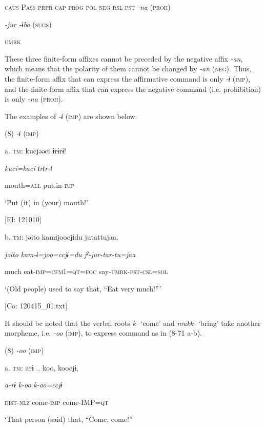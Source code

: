     \textsc{caus}  P\textsc{ass}  \textsc{prpr}  \textsc{cap}  \textsc{prog}  \textsc{pol}  \textsc{neg}  \textsc{rsl}  \textsc{pst}    \textit{{}-na} (\textsc{proh})

          \textit{{}-jur      {}-ɨba} (\textsc{sugs})

          \textsc{umrk}

These three finite-form affixes cannot be preceded by the negative affix \textit{{}-an}, which means that the polarity of them cannot be changed by \textit{{}-an} (\textsc{neg}). Thus, the finite-form affix that can express the affirmative command is only \textit{{}-ɨ} (\textsc{imp}), and the finite-form affix that can express the negative command (i.e. prohibition) is only \textit{{}-na} (\textsc{proh}).

  The examples of \textit{{}-ɨ} (\textsc{imp}) are shown below.

(8)  \textit{{}-ɨ} (\textsc{imp})

  a.  \textsc{tm}:  kucjəəci  ɨrɨrɨ!

      \textit{kuci=kaci}  \textit{ɨrɨr-ɨ}

      mouth=\textsc{all}  put.in-\textsc{imp}

      ‘Put (it) in (your) mouth!’

      [El: 121010]

  b.  \textsc{tm}:  jəito  kamɨjoocjɨdu  jutattujaa.

      \textit{jəito}  \textit{kam-ɨ=joo=ccjɨ=du}  \textit{jˀ-jur-tar-tu=jaa}

      much  eat-\textsc{imp}=\textsc{cfm}1=\textsc{qt}=\textsc{foc}  say-\textsc{umrk}-\textsc{pst}-\textsc{csl}=\textsc{sol}

      ‘(Old people) used to say that, “Eat very much!”’

      [Co: 120415\_01.txt]

It should be noted that the verbal roots \textit{k-} ‘come’ and \textit{mukk-} ‘bring’ take another morpheme, i.e. \textit{{}-oo} (\textsc{imp}), to express command as in (8-71 a-b).

(8)  \textit{{}-oo} (\textsc{imp})

  a.  \textsc{tm}:  arɨ ..  koo,  koocjɨ,

      \textit{a-rɨ}  \textit{k-oo}  \textit{k-oo=ccjɨ}

      \textsc{dist}-\textsc{nlz}  come-\textsc{imp}  come-IMP=\textsc{qt}

      ‘That person (said) that, “Come, come!”’

